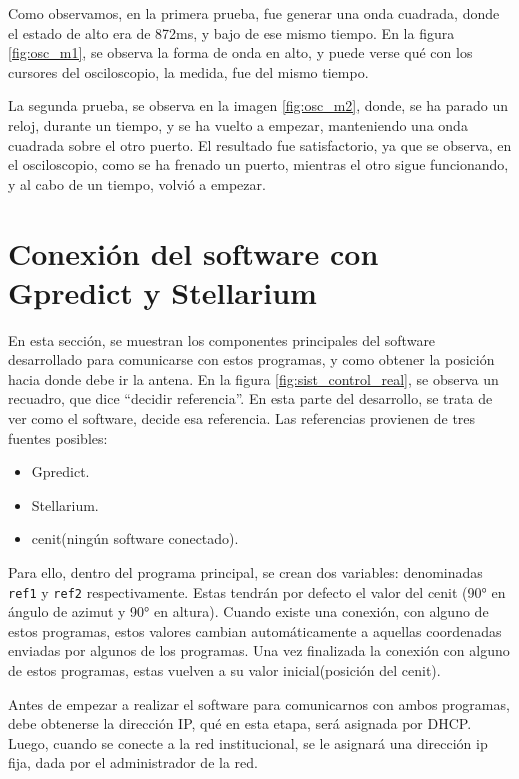 Como observamos, en la primera prueba, fue generar una onda cuadrada, donde el estado de alto era de 872ms, y bajo de ese mismo tiempo. En la figura \ref{fig:osc_m1}, se observa la forma de onda en alto, y puede verse qué con los cursores del osciloscopio, la medida, fue del mismo tiempo. 


La segunda prueba, se observa en la imagen \ref{fig:osc_m2}, donde, se ha parado un reloj, durante un tiempo, y se ha vuelto a empezar, manteniendo una onda cuadrada sobre el otro puerto. El resultado fue satisfactorio, ya que se observa, en el osciloscopio, como se ha frenado un puerto, mientras el otro sigue funcionando, y al cabo de un tiempo, volvió a empezar.  
 

\section{Conexión del software con Gpredict y Stellarium} 

En esta sección, se muestran los componentes principales del software desarrollado para comunicarse con estos programas, y como obtener la posición hacia donde debe ir la antena. En la figura \ref{fig:sist_control_real}, se observa un recuadro, que dice ``decidir referencia''. En esta parte del desarrollo, se trata de ver como el software, decide esa referencia. Las referencias provienen de tres fuentes posibles: 
\begin{itemize}
	\item Gpredict.  
	\item Stellarium. 
	\item cenit(ningún software conectado).
\end{itemize} 

Para ello, dentro del programa principal, se crean dos variables: denominadas \texttt{ref1} y \texttt{ref2} respectivamente. Estas tendrán por defecto el valor del cenit (90° en ángulo de azimut y 90° en altura). Cuando existe una conexión, con alguno de estos programas, estos valores cambian automáticamente a aquellas coordenadas enviadas por algunos de los programas. Una vez finalizada la conexión con alguno de estos programas, estas vuelven a su valor inicial(posición del cenit). 

Antes de empezar a realizar el software para comunicarnos con ambos programas, debe obtenerse la dirección IP, qué en esta etapa, será asignada por DHCP. Luego, cuando se conecte a la red institucional, se le asignará una dirección ip fija, dada por el administrador de la red. 

